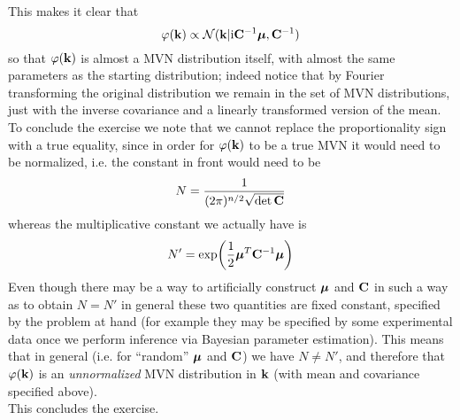 \documentclass[a4paper]{article}
\newcommand{\mat}[1]{\vb{#1}}
\let\temp\phi%
\let\phi\varphi
\let\varphi\temp
\renewcommand{\i}{\mathrm{i}} %
\begin{document}
This makes it clear that
\begin{equation*}
    \phi(\vb{k}) \propto\mathcal{N}(\vb{k}|\i \mat{C}^{-1}\vb*{\mu}, \mat{C}^{-1})
\end{equation*}
so that $\phi(\vb{k})$ is almost a MVN distribution itself, with almost the same parameters as the starting distribution; indeed notice that by Fourier transforming the original distribution we remain in the set of MVN distributions, just with the inverse covariance and a linearly transformed version of the mean.\\
To conclude the exercise we note that we cannot replace the proportionality sign with a true equality, since in order for $\phi(\vb{k})$ to be a true MVN it would need to be normalized, i.e. the constant in front would need to be
\begin{equation*}
    N = \frac{1}{(2\pi)^{n/2}\sqrt{\det\mat{C}}}
\end{equation*}
whereas the multiplicative constant we actually have is 
\begin{equation*}
    N' = \exp(\frac{1}{2}\vb*{\mu}^T \mat{C}^{-1} \vb*{\mu})
\end{equation*}
Even though there may be a way to artificially construct $\vb*{\mu}$ and $\mat{C}$ in such a way as to obtain $N=N'$ in general these two quantities are fixed constant, specified by the problem at hand (for example they may be specified by some experimental data once we perform inference via Bayesian parameter estimation). This means that in general (i.e. for ``random'' $\vb*{\mu}$ and $\mat{C}$) we have $N\neq N'$, and therefore that $\phi(\vb{k})$ is an \emph{unnormalized} MVN distribution in $\vb{k}$ (with mean and covariance specified above).\\
This concludes the exercise.
\end{document}
